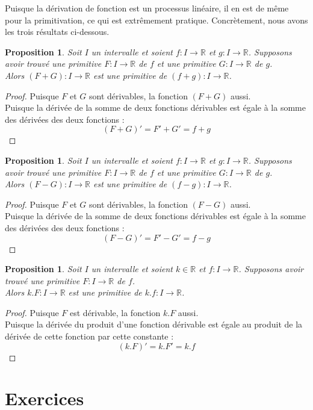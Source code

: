 \documentclass[a4paper,fontsize=13pt]{scrreprt}
\theoremstyle{plain}
\newtheorem{pro}[subsection]{Proposition}
\theoremstyle{definition}
\newcommand{\rr}{\mathbb{R}}
\begin{document}
Puisque la dérivation de fonction est un processus linéaire, il en est de même pour la primitivation, ce qui est extrêmement pratique. Concrètement, nous avons les trois résultats ci-dessous.
\begin{pro}
Soit $I$ un intervalle et soient $f : I \to \rr$ et $g : I \to \rr$. Supposons avoir trouvé une primitive $F : I \to \rr$ de $f$ et une primitive $G : I \to \rr$ de $g$. \\
Alors $(F+G) : I \to \rr$ est une primitive de $(f+g) : I \to \rr$.\end{pro}
\begin{proof}
Puisque $F$ et $G$ sont dérivables, la fonction $(F+G)$ aussi. \\
Puisque la dérivée de la somme de deux fonctions dérivables est égale à la somme des dérivées des deux fonctions :
$$(F+G)'=F'+G'=f+g$$
\end{proof}
\begin{pro}
Soit $I$ un intervalle et soient $f : I \to \rr$ et $g : I \to \rr$. Supposons avoir trouvé une primitive $F : I \to \rr$ de $f$ et une primitive $G : I \to \rr$ de $g$. \\
Alors $(F-G) : I \to \rr$ est une primitive de $(f-g) : I \to \rr$.\end{pro}
\begin{proof}
Puisque $F$ et $G$ sont dérivables, la fonction $(F-G)$ aussi. \\
Puisque la dérivée de la somme de deux fonctions dérivables est égale à la somme des dérivées des deux fonctions :
$$(F-G)'=F'-G'=f-g$$
\end{proof}
\begin{pro}
Soit $I$ un intervalle et soient $k \in \rr$ et $f : I \to \rr$. Supposons avoir trouvé une primitive $F : I \to \rr$ de $f$. \\
Alors $k.F : I \to \rr$ est une primitive de $k.f : I \to \rr$.\end{pro}
\begin{proof}
Puisque $F$ est dérivable, la fonction $k.F$ aussi. \\
Puisque la dérivée du produit d'une fonction dérivable est égale au produit de la dérivée de cette fonction par cette constante :
$$(k.F)'=k.F'=k.f$$
\end{proof}

\section{Exercices}
\end{document}

